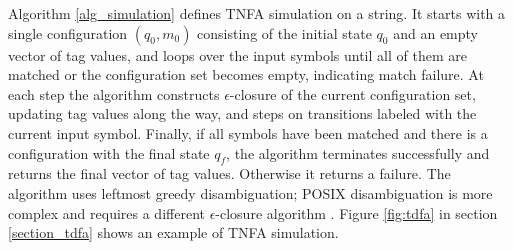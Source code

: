 \documentclass[]{article}
\begin{document}
Algorithm \ref{alg_simulation} defines TNFA simulation on a string.
It starts with a single configuration $(q_0, m_0)$ consisting of the initial state $q_0$ and an empty vector of tag values,
and loops over the input symbols until all of them are matched or the configuration set becomes empty, indicating match failure.
At each step the algorithm constructs $\epsilon$-closure of the current configuration set, updating tag values along the way, and steps on transitions labeled with the current input symbol.
Finally, if all symbols have been matched and there is a configuration with the final state $q_f$, the algorithm terminates successfully and returns the final vector of tag values.
Otherwise it returns a failure.
The algorithm uses leftmost greedy disambiguation; POSIX disambiguation is more complex and requires a different $\epsilon$-closure algorithm \cite{BorTro19}.
Figure \ref{fig:tdfa} in section \ref{section_tdfa} shows an example of TNFA simulation.

\end{document}
